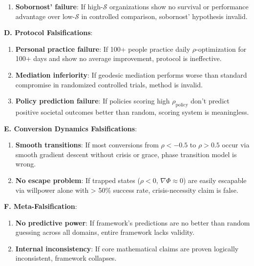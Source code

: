 \documentclass[11pt,a4paper]{article}
\theoremstyle{definition}
\theoremstyle{remark}
\begin{document}
\begin{small}
\begin{enumerate}
\begin{mdframed}[backgroundcolor=red!10,linewidth=2pt,linecolor=red!70!black]
\begin{enumerate}
    \item \textbf{Sobornost' failure}: If high-\(\mathcal{S}\) organizations show no survival or performance advantage over low-\(\mathcal{S}\) in controlled comparison, sobornost' hypothesis invalid.
\end{enumerate}

\textbf{D. Protocol Falsifications}:
\begin{enumerate}
    \item \textbf{Personal practice failure}: If 100+ people practice daily \(\rho\)-optimization for 100+ days and show no average improvement, protocol is ineffective.
    
    \item \textbf{Mediation inferiority}: If geodesic mediation performs worse than standard compromise in randomized controlled trials, method is invalid.
    
    \item \textbf{Policy prediction failure}: If policies scoring high \(\rho_{\text{policy}}\) don't predict positive societal outcomes better than random, scoring system is meaningless.
\end{enumerate}

\textbf{E. Conversion Dynamics Falsifications}:
\begin{enumerate}
    \item \textbf{Smooth transitions}: If most conversions from \(\rho < -0.5\) to \(\rho > 0.5\) occur via smooth gradient descent without crisis or grace, phase transition model is wrong.
    
    \item \textbf{No escape problem}: If trapped states (\(\rho < 0\), \(\nabla \Phi \approx 0\)) are easily escapable via willpower alone with > 50\% success rate, crisis-necessity claim is false.
\end{enumerate}

\textbf{F. Meta-Falsification}:
\begin{enumerate}
    \item \textbf{No predictive power}: If framework's predictions are no better than random guessing across all domains, entire framework lacks validity.
    
    \item \textbf{Internal inconsistency}: If core mathematical claims are proven logically inconsistent, framework collapses.
\end{enumerate}
\end{mdframed}


\end{enumerate}
\end{small}
\end{document}
